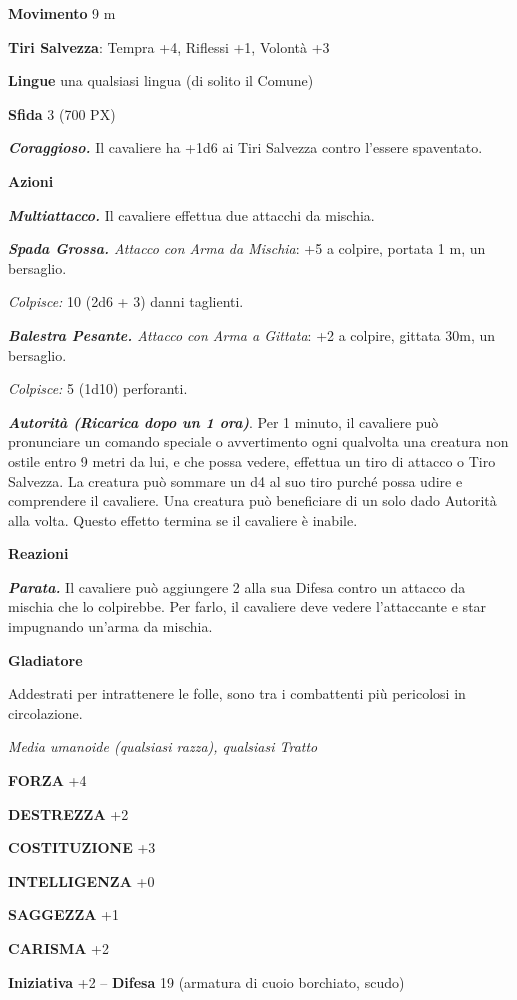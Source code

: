 \begin{multicols}{2}
\textbf{Movimento} 9 m

\textbf{Tiri Salvezza}: Tempra +4, Riflessi +1, Volontà +3

\textbf{Lingue} una qualsiasi lingua (di solito il Comune)

\textbf{Sfida} 3 (700 PX)

\textit{\textbf{Coraggioso.}} Il cavaliere ha +1d6 ai Tiri Salvezza contro l'essere spaventato.

\textbf{Azioni}

\textit{\textbf{Multiattacco.}} Il cavaliere effettua due attacchi da mischia.

\textit{\textbf{Spada Grossa.} Attacco con Arma da Mischia}: +5 a colpire, portata 1 m, un bersaglio.

\textit{Colpisce:} 10 (2d6 + 3) danni taglienti.

\textit{\textbf{Balestra Pesante.} Attacco con Arma a Gittata}: +2 a colpire, gittata 30m, un bersaglio.

\textit{Colpisce:} 5 (1d10) perforanti.

\textit{\textbf{Autorità (Ricarica dopo un 1 ora)}}. Per 1 minuto, il cavaliere può pronunciare un comando speciale o avvertimento ogni qualvolta una creatura non ostile entro 9 metri da lui, e che possa vedere, effettua un tiro di attacco o Tiro Salvezza. La creatura può sommare un d4 al suo tiro purché possa udire e comprendere il cavaliere. Una creatura può beneficiare di un solo dado Autorità alla volta. Questo effetto termina se il cavaliere è inabile.

\textbf{Reazioni}

\textit{\textbf{Parata.}} Il cavaliere può aggiungere 2 alla sua Difesa contro un attacco da mischia che lo colpirebbe. Per farlo, il cavaliere deve vedere l'attaccante e star impugnando un'arma da mischia.

\medskip\textbf{Gladiatore}

Addestrati per intrattenere le folle, sono tra i combattenti più pericolosi in circolazione.

\textit{Media umanoide (qualsiasi razza), qualsiasi Tratto}

\textbf{FORZA} +4

\textbf{DESTREZZA} +2

\textbf{COSTITUZIONE} +3

\textbf{INTELLIGENZA} +0

\textbf{SAGGEZZA} +1

\textbf{CARISMA} +2

\textbf{Iniziativa} +2 -- \textbf{Difesa} 19 (armatura di cuoio borchiato, scudo)


\end{multicols}
